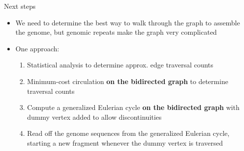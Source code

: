 \documentclass[xcolor=dvipsnames]{beamer}
\begin{document}
\begin{frame}{Next steps}
    \begin{itemize}
        \item We need to determine the best way to walk through the graph to
            assemble the genome, but genomic repeats make the graph very
            complicated
        \item One approach:
            \begin{enumerate}
                \item Statistical analysis to determine approx. edge traversal counts
                \item Minimum-cost circulation {\bf on the bidirected graph} to
                      determine traversal counts
                \item Compute a generalized Eulerian cycle {\bf on the bidirected graph}
                      with dummy vertex added to allow discontinuities
                \item Read off the genome sequences from the generalized Eulerian cycle,
                      starting a new fragment whenever the dummy vertex is traversed
            \end{enumerate}
    \end{itemize}
\end{frame}
\end{document}
